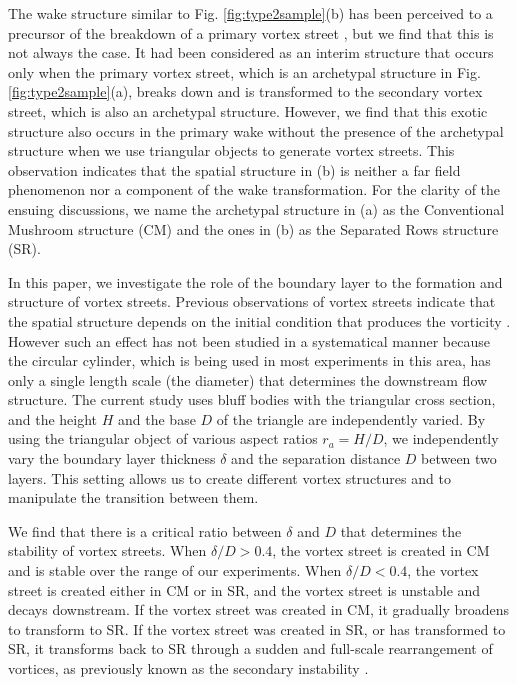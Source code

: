 \documentclass[english, aps, prl, longbibliography, preprint]{revtex4-1}
\newcommand\citepar\citep
\begin{document}
The wake structure similar to Fig. \ref{fig:type2sample}(b) has been perceived to a precursor of the breakdown of a primary vortex street \citepar{Taneda:1959wj,Henderson:1996tc,Inoue:1999wi,Vorobieff_2002,Wang_2010,Kumar_2012,Dynnikova:2016is}, but we find that this is not always the case.
It had been considered as an interim structure that occurs only when the primary vortex street, which is an archetypal structure in Fig. \ref{fig:type2sample}(a), breaks down and is transformed to the secondary vortex street, which is also an archetypal structure.
However, we find that this exotic structure also occurs in the primary wake without the presence of the archetypal structure when we use triangular objects to generate vortex streets.
This observation indicates that the spatial structure in (b) is neither a far field phenomenon nor a component of the wake transformation.
For the clarity of the ensuing discussions, we name the archetypal structure in (a) as the Conventional Mushroom structure (CM) and the ones in (b) as the Separated Rows structure (SR). 

In this paper, we investigate the role of the boundary layer to the formation and structure of vortex streets.
Previous observations of vortex streets indicate that the spatial structure depends on the initial condition that produces the vorticity \citepar{Kim:2015jp}.
However such an effect has not been studied in a systematical manner because the circular cylinder, which is being used in most experiments in this area, has only a single length scale (the diameter) that determines the downstream flow structure.
The current study uses bluff bodies with the triangular cross section, and the height $H$ and the base $D$ of the triangle are independently varied.
By using the triangular object of various aspect ratios $r_a=H/D$, we independently vary the boundary layer thickness $\delta$ and the separation distance $D$ between two layers.
This setting allows us to create different vortex structures and to manipulate the transition between them.

We find that there is a critical ratio between $\delta$ and $D$ that determines the stability of vortex streets.
When $\delta/D>0.4$, the vortex street is created in CM and is stable over the range of our experiments.
When $\delta/D<0.4$, the vortex street is created either in CM or in SR, and the vortex street is unstable and decays downstream.
If the vortex street was created in CM, it gradually broadens to transform to SR.
If the vortex street was created in SR, or has transformed to SR, it transforms back to SR through a sudden and full-scale rearrangement of vortices, as previously known as the secondary instability \citepar{Williamson1993,Cimbala1988,Inoue:1999wi,Vorobieff_2002,Wang_2010,Kumar_2012,Dynnikova:2016is}. 
\end{document}
